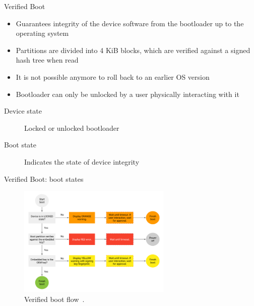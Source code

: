 \documentclass[
    11pt,%
    aspectratio=169,%
]{beamer}
\begin{document}
\begin{frame}{Verified Boot}
\begin{itemize}
  \item Guarantees integrity of the device software from the bootloader up to the operating system\newline
  \item Partitions are divided into 4 KiB blocks, which are verified against a signed hash tree when read\newline
  \item It is not possible anymore to roll back to an earlier OS version\newline
  \item Bootloader can only be unlocked by a user physically interacting with it

\end{itemize}
\begin{description}
  \item[Device state] Locked or unlocked bootloader
  \item[Boot state] Indicates the state of device integrity

\end{description}
\end{frame}



\begin{frame}{Verified Boot: boot states}
\begin{figure}[t]
	\centering
	\includegraphics[width=0.65\textwidth]{img/verified_boot}
	\caption{Verified boot flow~\cite{android_verified_boot}.}
	\label{fig:android_verified_boot}
\end{figure}
\end{frame}
\end{document}
